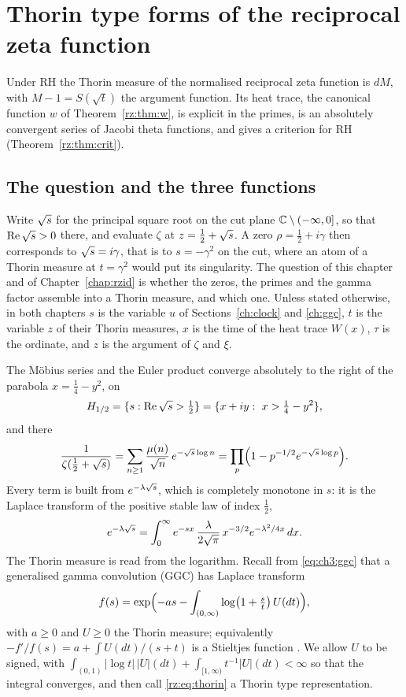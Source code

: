 \section{Thorin type forms of the reciprocal zeta function}\label{ch:rz1}

Under RH the Thorin measure of the normalised reciprocal zeta function is $dM$, with $M-1=S(\sqrt t)$ the argument function. Its heat trace, the canonical function $w$ of Theorem~\ref{rz:thm:w}, is explicit in the primes, is an absolutely convergent series of Jacobi theta functions, and gives a criterion for RH (Theorem~\ref{rz:thm:crit}).

\subsection{The question and the three functions}\label{rz:sec:intro}

Write $\sqrt{s}$ for the principal square root on the cut plane $\mathbb{C}\setminus(-\infty,0]$, so that $\operatorname{Re}\sqrt{s}>0$ there, and evaluate $\zeta$ at $z=\frac12+\sqrt{s}$. A zero $\rho=\frac12+i\gamma$ then corresponds to $\sqrt{s}=i\gamma$, that is to $s=-\gamma^2$ on the cut, where an atom of a Thorin measure at $t=\gamma^2$ would put its singularity. The question of this chapter and of Chapter~\ref{chap:rzid} is whether the zeros, the primes and the gamma factor assemble into a Thorin measure, and which one. Unless stated otherwise, in both chapters $s$ is the variable $u$ of Sections~\ref{ch:clock} and \ref{ch:ggc}, $t$ is the variable $z$ of their Thorin measures, $x$ is the time of the heat trace $W(x)$, $\tau$ is the ordinate, and $z$ is the argument of $\zeta$ and $\xi$.

The M\"obius series and the Euler product converge absolutely to the right of the parabola $x=\frac14-y^2$, on
\[
H_{1/2}=\{s:\Re\sqs>\tfrac12\}=\{x+iy:\ x>\tfrac14-y^2\},
\]
and there
\begin{equation}\label{rz:eq:basic}
\frac{1}{\zeta(\frac12+\sqrt{s})}=\sum_{n\ge1}\frac{\mu(n)}{\sqrt n}\,e^{-\sqrt{s}\log n}
=\prod_{p}\Bigl(1-p^{-1/2}e^{-\sqrt{s}\log p}\Bigr).
\end{equation}
Every term is built from $e^{-\lambda\sqrt{s}}$, which is completely monotone in $s$: it is the Laplace transform of the positive stable law of index $\frac12$,
\begin{equation}\label{rz:eq:levy}
e^{-\lambda\sqrt{s}}=\int_0^\infty e^{-sx}\,\frac{\lambda}{2\sqrt\pi}\,x^{-3/2}e^{-\lambda^2/4x}\,dx .
\end{equation}
The Thorin measure is read from the logarithm. Recall from \eqref{eq:ch3:ggc} that a generalised gamma convolution (GGC) has Laplace transform
\begin{equation}\label{rz:eq:thorin}
f(s)=\exp\Bigl(-as-\int_{(0,\infty)}\log\bigl(1+\tfrac st\bigr)\,U(dt)\Bigr),
\end{equation}
with $a\ge0$ and $U\ge0$ the Thorin measure; equivalently $-f'/f(s)=a+\int U(dt)/(s+t)$ is a Stieltjes function \cite{Bondesson}. We allow $U$ to be signed, with $\int_{(0,1)}|\log t|\,|U|(dt)+\int_{[1,\infty)}t^{-1}|U|(dt)<\infty$ so that the integral converges, and then call \eqref{rz:eq:thorin} a Thorin type representation.


